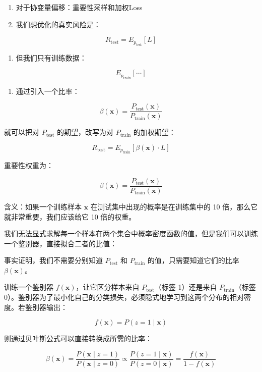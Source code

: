 \begin{enumerate}
\def\labelenumi{\arabic{enumi}.}
\item
  对于协变量偏移：重要性采样和加权Loss
\item
  我们想优化的真实风险是：
\end{enumerate}

\[
R_{\mathrm{test}}=E_{p_{\mathrm{test}}}[L]
\]

\begin{enumerate}
\def\labelenumi{\arabic{enumi}.}
\setcounter{enumi}{1}
\tightlist
\item
  但我们只有训练数据：
\end{enumerate}

\[
E_{p_{\mathrm{train}}}[\cdots]
\]

\begin{enumerate}
\def\labelenumi{\arabic{enumi}.}
\setcounter{enumi}{2}
\tightlist
\item
  通过引入一个比率：
\end{enumerate}

\[
\beta(\mathbf{x})=\frac{P_{\mathrm{test}}(\mathbf{x})}{P_{\mathrm{train}}(\mathbf{x})}
\]

就可以把对 \(P_{\mathrm{test}}\) 的期望，改写为对 \(P_{\mathrm{train}}\) 的加权期望：

\[
R_{\mathrm{test}}=E_{p_{\mathrm{train}}}[\beta(\mathbf{x})\cdot L]
\]

重要性权重为：

\[
\beta(\mathbf{x})=\frac{P_{\mathrm{test}}(\mathbf{x})}{P_{\mathrm{train}}(\mathbf{x})}
\]

含义：如果一个训练样本 \(\mathbf{x}\) 在测试集中出现的概率是在训练集中的 10 倍，那么它就非常重要，我们应该给它 10 倍的权重。

我们无法显式求解每一个样本在两个集合中概率密度函数的值，但是我们可以训练一个鉴别器，直接拟合二者的比值：

事实证明，我们不需要分别知道 \(P_{\mathrm{test}}\) 和 \(P_{\mathrm{train}}\) 的值，只需要知道它们的比率 \(\beta(\mathbf{x})\)。

训练一个鉴别器 \(f(\mathbf{x})\)，让它区分样本来自 \(P_{\mathrm{test}}\)（标签 1）还是来自 \(P_{\mathrm{train}}\)（标签 0）。鉴别器为了最小化自己的分类损失，必须隐式地学习到这两个分布的相对密度。若鉴别器输出：

\[
f(\mathbf{x})=P(z=1\mid\mathbf{x})
\]

则通过贝叶斯公式可以直接转换成所需的比率：

\[
\beta(\mathbf{x})
=\frac{P(\mathbf{x}\mid z=1)}{P(\mathbf{x}\mid z=0)}
\propto\frac{P(z=1\mid\mathbf{x})}{P(z=0\mid\mathbf{x})}
=\frac{f(\mathbf{x})}{1-f(\mathbf{x})}
\]

